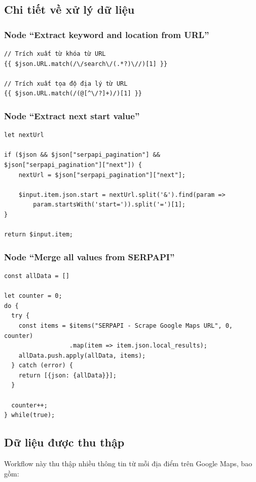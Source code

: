 \subsection{Chi tiết về xử lý dữ liệu}

\subsubsection{Node ``Extract keyword and location from URL''}
\begin{verbatim}
// Trích xuất từ khóa từ URL
{{ $json.URL.match(/\/search\/(.*?)\//)[1] }}

// Trích xuất tọa độ địa lý từ URL
{{ $json.URL.match(/(@[^\/?]+)/)[1] }}
\end{verbatim}

\subsubsection{Node ``Extract next start value''}
\begin{verbatim}
let nextUrl

if ($json && $json["serpapi_pagination"] && $json["serpapi_pagination"]["next"]) {
    nextUrl = $json["serpapi_pagination"]["next"];
    
    $input.item.json.start = nextUrl.split('&').find(param => 
        param.startsWith('start=')).split('=')[1];
}

return $input.item;
\end{verbatim}

\subsubsection{Node ``Merge all values from SERPAPI''}
\begin{verbatim}
const allData = []

let counter = 0;
do {
  try {
    const items = $items("SERPAPI - Scrape Google Maps URL", 0, counter)
                  .map(item => item.json.local_results);
    allData.push.apply(allData, items);
  } catch (error) {
    return [{json: {allData}}];  
  }

  counter++;
} while(true);
\end{verbatim}

\subsection{Dữ liệu được thu thập}

Workflow này thu thập nhiều thông tin từ mỗi địa điểm trên Google Maps, bao gồm:

